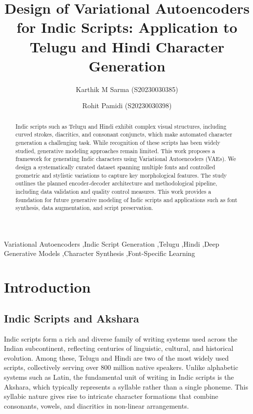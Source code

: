 \documentclass[review]{elsarticle}
\begin{document}
\begin{frontmatter}

\title{Design of Variational Autoencoders for Indic Scripts: Application to Telugu and Hindi Character Generation}

\author{Karthik M Sarma (S20230030385)}
\author{Rohit Pamidi (S20230030398)}

\address{Indian Institute of Information Technology, Sri City, Andhra Pradesh 517646, India}

\begin{abstract}
Indic scripts such as Telugu and Hindi exhibit complex visual structures, including curved strokes, diacritics, and consonant conjuncts, which make automated character generation a challenging task. While recognition of these scripts has been widely studied, generative modeling approaches remain limited. This work proposes a framework for generating Indic characters using Variational Autoencoders (VAEs). We design a systematically curated dataset spanning multiple fonts and controlled geometric and stylistic variations to capture key morphological features. The study outlines the planned encoder-decoder architecture and methodological pipeline, including data validation and quality control measures. This work provides a foundation for future generative modeling of Indic scripts and applications such as font synthesis, data augmentation, and script preservation.
\end{abstract}

\begin{keyword}
Variational Autoencoders \sep Indic Script Generation \sep Telugu \sep Hindi \sep Deep Generative Models \sep Character Synthesis \sep Font-Specific Learning
\end{keyword}

\end{frontmatter}

\linenumbers

\section{Introduction}
\label{sec:introduction}

\subsection{Indic Scripts and Akshara}

Indic scripts form a rich and diverse family of writing systems used across the Indian subcontinent, reflecting centuries of linguistic, cultural, and historical evolution. Among these, Telugu and Hindi are two of the most widely used scripts, collectively serving over 800 million native speakers. Unlike alphabetic systems such as Latin, the fundamental unit of writing in Indic scripts is the Akshara, which typically represents a syllable rather than a single phoneme. This syllabic nature gives rise to intricate character formations that combine consonants, vowels, and diacritics in non-linear arrangements.
\end{document}
